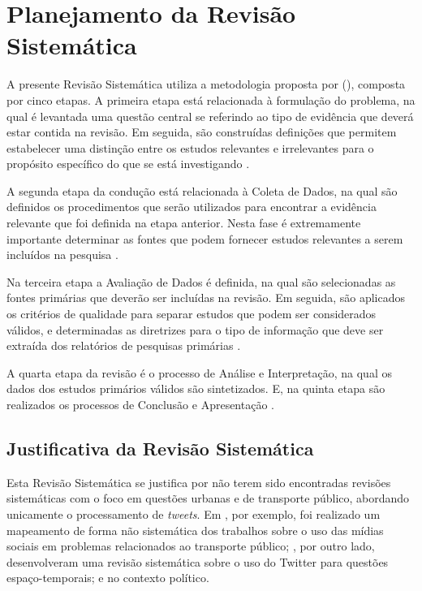 \documentclass[
	12pt,				%
	oneside,			%
	a4paper,			%
	english,			%
	brazil				%
	]{abntex2ppgsi}
\begin{document}

\section{Planejamento da Revisão Sistemática}
\label{planejamento}
A presente Revisão Sistemática utiliza a metodologia proposta por \citeauthor{biolchini2005techincal} (\citeyear{biolchini2005techincal}), composta por cinco etapas.
A primeira etapa está relacionada à formulação do problema, na qual é levantada uma questão central se referindo ao tipo de evidência que deverá  estar contida na revisão. Em seguida, são construídas definições que permitem estabelecer uma distinção entre os estudos relevantes e irrelevantes para o propósito específico do que se está investigando \cite{biolchini2005techincal}.

A segunda etapa da condução está relacionada à Coleta de Dados, na qual são definidos os procedimentos que serão utilizados para encontrar a evidência relevante que foi definida na etapa anterior. Nesta fase é extremamente importante determinar as fontes que podem fornecer estudos relevantes a serem incluídos na pesquisa \cite{biolchini2005techincal}.

Na terceira etapa a Avaliação de Dados é definida, na qual são selecionadas as fontes primárias que deverão ser incluídas na revisão. Em seguida,  são aplicados os critérios de qualidade para separar estudos que podem ser considerados válidos, e determinadas as diretrizes para o tipo de informação que deve ser extraída dos relatórios de pesquisas primárias \cite{biolchini2005techincal}.

A quarta etapa da revisão é o processo de Análise e Interpretação, na qual os dados dos estudos primários válidos são sintetizados. E, na quinta etapa são realizados os processos de Conclusão e Apresentação \cite{biolchini2005techincal}.

\subsection{Justificativa da Revisão Sistemática}
\label{justificativa}
Esta Revisão Sistemática se justifica por não terem sido encontradas revisões sistemáticas com o foco em questões urbanas e de transporte público, abordando unicamente o processamento de \textit{tweets}. Em \cite{Chaniotakis2016}, por exemplo, foi realizado um mapeamento de forma não sistemática dos trabalhos sobre o uso das mídias sociais em problemas relacionados ao transporte público; \cite{steiger2015advanced}, por outro lado, desenvolveram uma revisão sistemática sobre o uso do Twitter para questões espaço-temporais; e \cite{jungherr2016twitter} no contexto político.%
\end{document}
